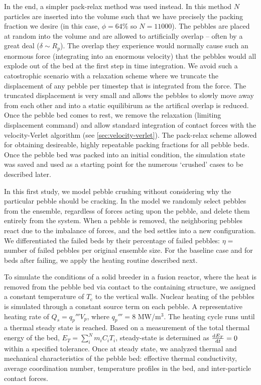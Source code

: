 In the end, a simpler pack-relax method was used instead. In this method $N$ particles are inserted into the volume such that we have precisely the packing fraction we desire (in this case, $\phi = 64\%$ so $N = 11000$). The pebbles are placed at random into the volume and are allowed to artificially overlap -- often by a great deal ($\delta \sim R_p$). The overlap they experience would normally cause such an enormous force (integrating into an enormous velocity) that the pebbles would all explode out of the bed at the first step in time integration. We avoid such a catostrophic scenario with a relaxation scheme where we truncate the displacement of any pebble per timestep that is integrated from the force. The truncated displacement is very small and allows the pebbles to slowly move away from each other and into a static equilibirum as the artifical overlap is reduced. Once the pebble bed comes to rest, we remove the relaxation (limiting displacement command) and allow standard integration of contact forces with the velocity-Verlet algorithm (see \cref{sec:velocity-verlet}). The pack-relax scheme allowed for obtaining desireable, highly repeatable packing fractions for all pebble beds. Once the pebble bed was packed into an initial condition, the simulation state was saved and used as a starting point for the numerous `crushed' cases to be described later.

In this first study, we model pebble crushing without considering why the particular pebble should be cracking. In the model we randomly select pebbles from the ensemble, regardless of forces acting upon the pebble, and delete them entirely from the system. When a pebble is removed, the neighboring pebbles react due to the imbalance of forces, and the bed settles into a new configuration. We differentiated the failed beds by their percentage of failed pebbles: $\eta = $ number of failed pebbles per original ensemble size. For the baseline case and for beds after failing, we apply the heating routine described next.

To simulate the conditions of a solid breeder in a fusion reactor, where the heat is removed from the pebble bed via contact to the containing structure, we assigned a constant temperature of $T_\text{c}$ to the vertical walls. Nuclear heating of the pebbles is simulated through a constant source term on each pebble. A representative heating rate of $Q_s = q_p'''V_p$, where  $q_p'''= 8$ MW/m$^3$. The heating cycle runs until a thermal steady state is reached. Based on a measurement of the total thermal energy of the bed, $E_T =\sum_i^N m_iC_i T_i$, steady-state is determined as $\frac{\mathrm{d}{E_T}}{\mathrm{d}t} = 0$ within a specified tolerance. Once at steady state, we analyzed thermal and mechanical characteristics of the pebble bed: effective thermal conductivity, average coordination number, temperature profiles in the bed, and inter-particle contact forces. 

